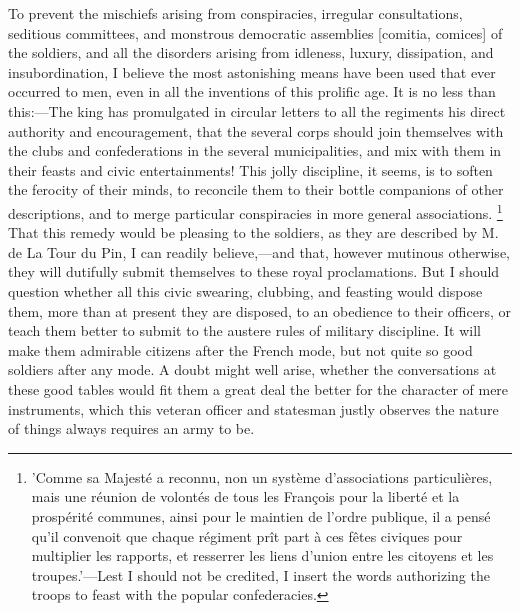 To prevent the mischiefs arising from conspiracies, irregular consultations, seditious committees, and monstrous democratic assemblies [comitia, comices] of the soldiers, and all the disorders arising from idleness, luxury, dissipation, and insubordination, I believe the most astonishing means have been used that ever occurred to men, even in all the inventions of this prolific age. It is no less than this:—The king has promulgated in circular letters to all the regiments his direct authority and encouragement, that the several corps should join themselves with the clubs and confederations in the several municipalities, and mix with them in their feasts and civic entertainments! This jolly discipline, it seems, is to soften the ferocity of their minds, to reconcile them to their bottle companions of other descriptions, and to merge particular conspiracies in more general associations.
\footnote{ 'Comme sa Majesté a reconnu, non un système d'associations particulières, mais une réunion de volontés de tous les François pour la liberté et la prospérité communes, ainsi pour le maintien de l'ordre publique, il a pensé qu'il convenoit que chaque régiment prît part à ces fêtes civiques pour multiplier les rapports, et resserrer les liens d'union entre les citoyens et les troupes.'—Lest I should not be credited, I insert the words authorizing the troops to feast with the popular confederacies.}
 That this remedy would be pleasing to the soldiers, as they are described by M. de La Tour du Pin, I can readily believe,—and that, however mutinous otherwise, they will dutifully submit themselves to these royal proclamations. But I should question whether all this civic swearing, clubbing, and feasting would dispose them, more than at present they are disposed, to an obedience to their officers, or teach them better to submit to the austere rules of military discipline. It will make them admirable citizens after the French mode, but not quite so good soldiers after any mode. A doubt might well arise, whether the conversations at these good tables would fit them a great deal the better for the character of mere instruments, which this veteran officer and statesman justly observes the nature of things always requires an army to be.

